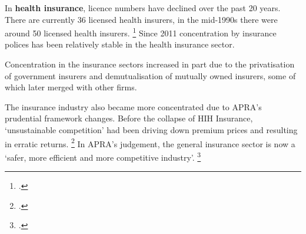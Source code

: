 In \textbf{health insurance}, licence numbers have declined over the past 20 years. There are currently 36 licensed health insurers, in the mid-1990s there were around 50 licensed health insurers.%
\footcites{PHIAC-competition-health}{APRA_PC_Sub_2017} Since 2011 concentration by insurance polices has been relatively stable in the health insurance sector.

Concentration in the insurance sectors increased in part due to the privatisation of government insurers and demutualisation of mutually owned insurers, some of which later merged with other firms.

The insurance industry also became more concentrated due to APRA's prudential framework changes.
Before the collapse of HIH Insurance, `unsustainable competition' had been driving down premium prices and resulting in erratic returns.
  \footcite[][23--24]{APRA_FSI_2014}
In APRA's judgement, the general insurance sector is now a `safer, more efficient and more competitive industry'.%
  \footcite[][23]{APRA_FSI_2014}  




